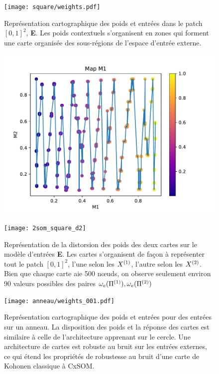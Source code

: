 \documentclass[../main]{subfiles}
\begin{document}
 \begin{figure}
 \begin{minipage}{\textwidth}
	\centering\texttt{[image: square/weights.pdf]}
	\caption{Représentation cartographique des poids et entrées dans le patch $[0,1]^2$, \textbf{E}. Les poids contextuels s'organisent en zones qui forment une carte organisée des sous-régions de l'espace d'entrée externe. \label{fig:ind}}
	\hfill\begin{minipage}{0.4\textwidth}
		\includegraphics[width=\textwidth]{2som_square_d}
	\end{minipage}
	\begin{minipage}{0.4\textwidth}
		\texttt{[image: 2som\_square\_d2]}
		
	\end{minipage}\hfill
	\caption{Représentation de la distorsion des poids des deux cartes sur le modèle d'entrées \textbf{E}. Les cartes s'organisent de façon à représenter tout le patch $[0,1]^2$, l'une selon les $X^{({1})}$, l'autre selon les $X^{({2})}$. Bien que chaque carte aie 500 n\oe{}uds, on observe seulement environ 90 valeurs possibles des paires $\omega_e(\Pi^{({1})}),\omega_e(\Pi^{({2})})$ \label{fig:2som_p_d}}
	
	\centering\texttt{[image: anneau/weights\_001.pdf]}
	\caption{Représentation cartographique des poids et entrées pour des entrées sur un anneau. La disposition des poids et la réponse des cartes est similaire à celle de l'architecture apprenant sur le cercle. Une architecture de cartes est robuste au bruit sur les entrées externes, ce qui étend les propriétés de robustesse au bruit d'une carte de Kohonen classique à CxSOM. \label{fig:anneau_w}}
\end{minipage}
\end{figure}
\end{document}
